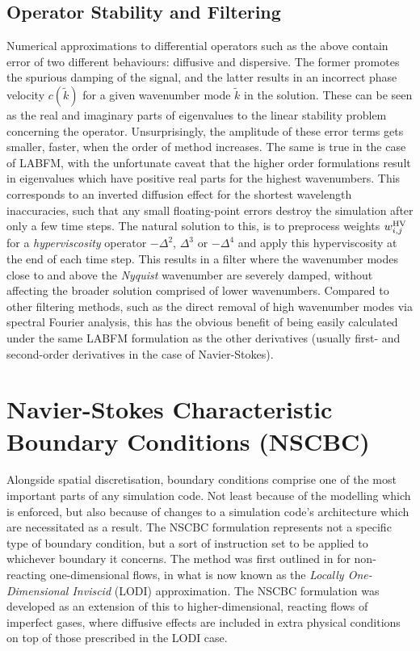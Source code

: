 \subsection{Operator Stability and Filtering}

Numerical approximations to differential operators such as the above contain error of two different behaviours: diffusive and dispersive. The former promotes the spurious damping of the signal, and the latter results in an incorrect phase velocity $c(\tilde{k})$ for a given wavenumber mode $\tilde{k}$ in the solution. These can be seen as the real and imaginary parts of eigenvalues to the linear stability problem concerning the operator. Unsurprisingly, the amplitude of these error terms gets smaller, faster, when the order of method increases. The same is true in the case of LABFM, with the unfortunate caveat that the higher order formulations result in eigenvalues which have positive real parts for the highest wavenumbers. This corresponds to an inverted diffusion effect for the shortest wavelength inaccuracies, such that any small floating-point errors destroy the simulation after only a few time steps. The natural solution to this, is to preprocess weights $w^{\rm{HV}}_{i, j}$ for a \emph{hyperviscosity} operator $-Δ^2$, $Δ^3$ or $-Δ^4$ and apply this hyperviscosity at the end of each time step. This results in a filter where the wavenumber modes close to and above the \emph{Nyquist} wavenumber \cite{nyquist1928CertainTopicsTelegraph} are severely damped, without affecting the broader solution comprised of lower wavenumbers. Compared to other filtering methods, such as the direct removal of high wavenumber modes via spectral Fourier analysis, this has the obvious benefit of being easily calculated under the same LABFM formulation as the other derivatives (usually first- and second-order derivatives in the case of Navier-Stokes).






\section{Navier-Stokes Characteristic Boundary Conditions (NSCBC)} \label{sec:NSCBC}

Alongside spatial discretisation, boundary conditions comprise one of the most important parts of any simulation code. Not least because of the modelling which is enforced, but also because of changes to a simulation code's architecture which are necessitated as a result. The NSCBC \cite{poinsot1992BoundaryConditionsDirect,poinsot2001TheoreticalNumericalCombustion} formulation represents not a specific type of boundary condition, but a sort of instruction set to be applied to whichever boundary it concerns. The method was first outlined in \cite{thompson1987TimeDependentBoundary,thompson1987LecturesSeriesComputational,thompson1990TimeDependentBoundaryConditions} for non-reacting one-dimensional flows, in what is now known as the \emph{Locally One-Dimensional Inviscid} (LODI) approximation. The NSCBC formulation was developed as an extension of this to higher-dimensional, reacting flows of imperfect gases, where diffusive effects are included in extra physical conditions on top of those prescribed in the LODI case.


